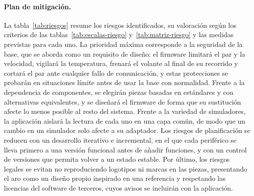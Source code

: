 \paragraph{Plan de mitigación.}
La tabla~\ref{tab:riesgos} resume los riesgos identificados, su valoración según los criterios de las tablas~\ref{tab:escalas-riesgo} y~\ref{tab:matriz-riesgo} y las medidas previstas para cada uno. La prioridad máxima corresponde a la seguridad de la base, que se aborda como un requisito de diseño: el firmware limitará el par y la velocidad, vigilará la temperatura, frenará el volante al final de su recorrido y cortará el par ante cualquier fallo de comunicación, y estas protecciones se probarán en situaciones límite antes de usar la base con normalidad. Frente a la dependencia de componentes, se elegirán piezas basadas en estándares y con alternativas equivalentes, y se diseñará el firmware de forma que su sustitución afecte lo menos posible al resto del sistema. Frente a la variedad de simuladores, la aplicación aislará la lectura de cada uno en una capa común, de modo que un cambio en un simulador solo afecte a su adaptador. Los riesgos de planificación se reducen con un desarrollo iterativo e incremental, en el que cada periférico se lleva primero a una versión funcional antes de añadir funciones, y con un control de versiones que permita volver a un estado estable. Por último, los riesgos legales se evitan no reproduciendo logotipos ni marcas en las piezas, presentando el aro como un diseño propio inspirado en una referencia y respetando las licencias del software de terceros, cuyos avisos se incluirán con la aplicación.

